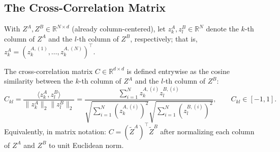 \documentclass[11pt, oneside, openany]{book}
\begin{document}
\subsection{The Cross-Correlation Matrix}
\label{sec:5.2.3}

With $Z^{A}, Z^{B} \in \mathbb{R}^{N \times d}$ (already column-centered), let $z_{k}^{A}, z_{l}^{B} \in \mathbb{R}^{N}$ denote the $k$-th column of $Z^{A}$ and the $l$-th column of $Z^{B}$, respectively; that is, $z_{k}^{A} = (z_{k}^{A,(1)}, \dots, z_{k}^{A,(N)})^{\top}$.

\begin{definition}
\label{def:5.1}
The cross-correlation matrix $C \in \mathbb{R}^{d \times d}$ is defined entrywise as the cosine similarity between the $k$-th column of $Z^{A}$ and the $l$-th column of $Z^{B}$:
\begin{equation}
\label{eq:5.19}
C_{kl} = \frac{\langle z_{k}^{A}, z_{l}^{B} \rangle}{\lVert z_{k}^{A} \rVert_{2} \lVert z_{l}^{B} \rVert_{2}} = \frac{\sum_{i=1}^{N} z_{k}^{A,(i)} z_{l}^{B,(i)}}{\sqrt{\sum_{i=1}^{N} (z_{k}^{A,(i)})^{2}} \sqrt{\sum_{i=1}^{N} (z_{l}^{B,(i)})^{2}}}, \qquad C_{kl} \in [-1, 1].
\end{equation}
Equivalently, in matrix notation: $C = (\tilde{Z}^{A})^{\top} \tilde{Z}^{B}$ after normalizing each column of $Z^{A}$ and $Z^{B}$ to unit Euclidean norm.
\end{definition}
\end{document}
